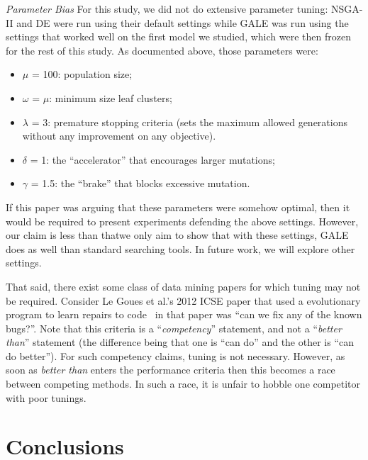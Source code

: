 \documentclass{sig-alternative}
\begin{document}
{\em Parameter Bias} 
For this study, we did not do extensive parameter tuning:
NSGA-II and DE were run using their default
settings while GALE was run using the settings that
worked well on the first model we studied, which were
then frozen for the rest of this study. As documented
above, those parameters were:
\begin{itemize}
\item $\mu$ = 100: population size;
\item $\omega$ = $\mu$: minimum size leaf clusters;
\item $\lambda$ = 3: premature stopping criteria (sets the maximum
allowed generations without any improvement
on any objective).
\item $\delta$ = 1: the ``accelerator'' that encourages larger
mutations;
\item $\gamma$ = 1.5: the ``brake'' that blocks excessive mutation.
\end{itemize}

If this paper was arguing that these parameters were
somehow optimal, then it would be required to present
experiments defending the above settings. However, our
claim is less than that\—we only aim to show that with
these settings, GALE does as well than standard searching
tools. In future work, we will explore other settings.




That said, there exist some class of data mining papers for which
tuning may not be required. Consider  Le Goues et al.'s 2012
ICSE paper that used a evolutionary program to learn
repairs to code~
in that paper was ``can we fix any of the known bugs?''. Note
that this criteria is a ``{\em competency}'' statement, and
not a ``{\em better than}'' statement (the difference being that
one is 
``can do'' and the other is ``can do better''). For such
competency claims, tuning is not necessary. However, as soon
as {\em better than} enters the performance criteria then this
becomes a race between competing methods. In such a race,
it is unfair to hobble one competitor with poor tunings.



\section{Conclusions}
\end{document}
